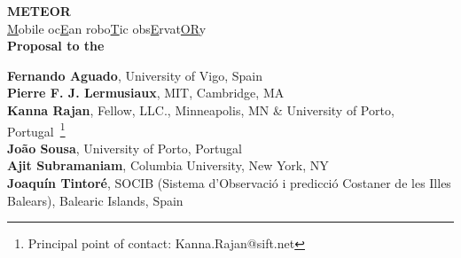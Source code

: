 \begin{titlepage}

  \begin{center}

    
    \Large{\textbf{METEOR}\\
      \underline{M}obile oc\underline{E}an robo\underline{T}ic obs\underline{E}rvat\underline{OR}y\\
      \vspace{+2.5in}
      \textbf{Proposal to the \kck}}

  \vspace{+2.9in}
  \large
  \textbf{Fernando Aguado}, University of Vigo, Spain\\
  \textbf{Pierre F. J. Lermusiaux}, MIT, Cambridge, MA\\
  \textbf{Kanna Rajan}, Fellow, \org LLC., Minneapolis, MN \& University of Porto, Portugal~\footnote{Principal point of
    contact: Kanna.Rajan@sift.net}\\
  \textbf{Jo\~ao Sousa}, University of Porto, Portugal\\
  \textbf{Ajit Subramaniam}, Columbia University, New York, NY\\
  \textbf{Joaqu\'{i}n Tintor\'{e}}, SOCIB (Sistema d’Observaci\'{o} i predicci\'{o} Costaner de les Illes Balears), Balearic Islands, Spain\\
  \vspace{+0.2in}



\end{center}
\end{titlepage}
